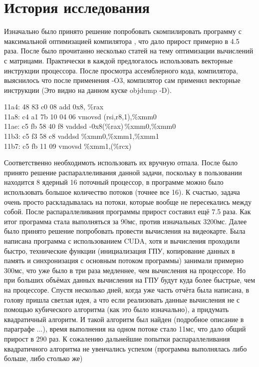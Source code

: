 \documentclass[a4peper, 12pt, titlepage, finall]{extreport}
\begin{document}
    \section{История исследования}
        Изначально было принято решение попробовать скомпилировать программу с максимальной оптимизацией компилятора {}, что дало прирост примерно в 4.5 раза. 
        После было прочитанно несколько статей на тему оптимизации вычислений с матрицами. 
        Практически в каждой предлогалось использовать векторные инструкции процессора. 
        После просмотра ассемблерного кода, компилятора, выяснилось что после применения {\ttfamily -O3}, компилятор сам применил векторные инструкции (Это видно на данном куске {\ttfamily objdump -D}). \\
    


        {
            \setlength{\parindent}{0em}

            {
                \setlength{\leftskip}{3em} \ttfamily
                11a4:	48 83 c0 08          	add    0x8, \%rax \\
                11a8:	c4 a1 7b 10 04 06    	vmovsd (rsi,r8,1),\%xmm0\\
                11ae:	c5 fb 58 40 f8       	vaddsd -0x8(\%rax)\,\%xmm0,\%xmm0\\
                11b3:	c5 f3 58 c8          	vaddsd \%xmm0,\%xmm1,\%xmm1\\
                11b7:	c5 fb 11 09          	vmovsd \%xmm1,(\%rcx) \\
    
            }
        }
        Соответственно необходимоть использовать их вручную отпала. После было принято решение распараллеливания данной задачи, поскольку в пользовании
        находится 8 ядерный 16 поточный процессор, в программе можно было использовать большое количество потоков (точнее все 16). 
        К счастью, задача очень просто раскладывалась на потоки, которые вообще не пересекались между собой. 
        После распараллеливания программы прирост составил ещё 7.5 раза. Как итог программа стала выполняться за 90мс, против изначальных 3200мс.
        Далее было принято решение попробовать провести вычисления на видеокарте. Была написана программа с использованием CUDA, 
        хотя и вычисления проходили быстро, технические функции (инициализация ГПУ, 
        копирование данных в память и синхронизация с основным потоком программы) занимали примерно 300мс, что уже было в три раза
        медленнее, чем вычисления на процессоре. Но при больших объёмах данных вычисления
        на ГПУ будут куда более быстрые, чем на процессоре.
        Спустя несколько дней, когда уже часть отчёта была написана, в голову пришла светлая
        идея, а что если реализовать данные вычисления не с помощью кубического алгоритма (как
        это было изначально), а придумать квадратичный алгоритм. И такой алгоритм был найден
        (подробное описание в параграфе ...), время выполнения на одном потоке стало 11мс, что
        дало общий прирост в 290 раз. К сожалению дальнейшие попытки распараллеливания
        квадратичного алгоритма не увенчались успехом (программа выполнялась либо больше,
        либо столько же)
\end{document}
